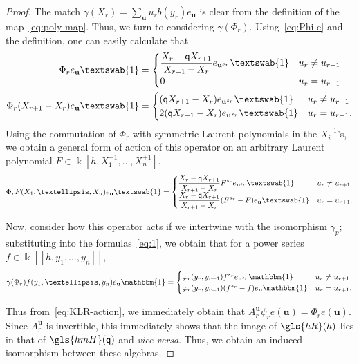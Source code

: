 \documentclass[10pt]{article}
\theoremstyle{definition}
\newcommand{\pq}{\mathsf{q}}
\newcommand{\hone}{\text{\textswab{1}}}
\newcommand{\K}{\Bbbk}%
\newcommand{\Bu}{\mathbf{u}}
\newcommand{\hmH}{\gls{hmH}}
\newcommand{\hR}{\gls{hR}}
\newcommand\llbracket{[\![}
\newcommand\rrbracket{]\!]}
\begin{document}
\begin{proof} 
The match $\gamma(X_r)=\sum_{\Bu}u_rb(y_r)e_{\Bu}$ is clear from
the definition of the map~\eqref{eq:poly-map}. Thus, we turn to considering $\gamma(\Phi_r)$.
Using~\eqref{eq:Phi-e} and the definition, one
can easily calculate that
\begin{align*}
 \Phi_r e_{\Bu} \hone&=
 \begin{cases}
 \displaystyle \frac{X_r-\pq X_{r+1}}{X_{r+1}-X_r}
 e_{\Bu^{s_r}} \hone& u_r\neq u_{r+1}\\
 0 & u_r= u_{r+1}
 \end{cases}\\
 \Phi_r (X_{r+1}-X_r) e_{\Bu}\hone&=
 \begin{cases}
 (\pq X_{r+1}-X_r) e_{\Bu^{s_r}} \hone & u_r\neq u_{r+1}\\2(\pq X_{r+1}-X_r)e_{\Bu^{s_r}} \hone& u_r= u_{r+1}.
 \end{cases}
\end{align*}
Using the commutation of $\Phi_r$ with symmetric Laurent polynomials
in the $X_i^{\pm 1}$'s, we obtain a general form of action of this
operator on an
arbitrary Laurent polynomial $F\in \K[h,X_1^{\pm 1},\dots, X_n^{\pm
 1}]$. 
\begin{equation}
\Phi_r F(X_1,\dots,X_n) e_{\Bu} \hone =
\begin{cases}
 \displaystyle \frac{X_r-\pq X_{r+1}}{X_{r+1}-X_r}F^{s_r}
 e_{\Bu^{s_r}} \hone& u_r\neq u_{r+1}\\
\displaystyle\frac{X_{r}- \pq X_{r+1}}{X_{r+1}-X_r}(F^{s_r}-F) e_{\Bu}
\hone & u_r= u_{r+1}.
\end{cases}\label{eq:1}
\end{equation}

 Now, consider how this operator acts if we intertwine with the
 isomorphism $\gamma_p$; substituting into the formulas~\eqref{eq:1},
 we obtain that for a power series $f\in \K\llbracket h,y_1,\dots, y_n\rrbracket $, 
\[\gamma(\Phi_r) f(y_1,\dots, y_n)e_{\Bu}\mathbbm{1} =\begin{cases}
 \displaystyle \varphi_r(y_r,y_{r+1})f^{s_r}
 e_{\Bu^{s_r}} \mathbbm{1}& u_r\neq u_{r+1}\\
\displaystyle \varphi_r(y_r,y_{r+1})
 ( f^{s_r}-f )e_{\Bu}\mathbbm{1}& u_r= u_{r+1}.
\end{cases}
\]


Thus from~\eqref{eq:KLR-action}, 
we immediately obtain that $A^{\Bu}_{r}\psi_r e(\Bu)=\Phi_r e(\Bu).$
Since $A^\Bu_r$ is invertible, this immediately shows that the image
of $\hR(h)$ lies in that of $\hmH(\pq)$ and \emph{vice versa}. Thus, we
obtain an induced isomorphism between these algebras.
\end{proof}
\end{document}
